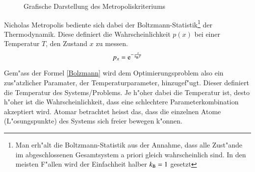 \begin{figure}[ht!]
\caption{Grafische Darstellung des Metropoliskriteriums}
\label{metropolissingle}
\end{figure}

Nicholas Metropolis bediente sich dabei der
Boltzmann-Statistik\footnote{Man erh"alt die Boltzmann-Statistik aus der
Annahme, dass alle Zust"ande im abgeschlossenen Gesamtsystem a priori
gleich wahrscheinlich sind. In den meisten F"allen wird der Einfachheit
halber $k_{\rm B} =1$ gesetzt} der Thermodynamik. Diese definiert die
Wahrscheinlichkeit $p(x)$ bei einer Temperatur $T$, den Zustand $x$
zu messen.
\begin{equation}p_x = {\rm e}^{-\frac{x}{k_{\rm B} T}}\label{Bolzmann}\end{equation}

Gem"ass der Formel \ref{Bolzmann} wird dem Optimierungsproblem also ein
zus"atzlicher Paramater, der Temperaturparameter, hinzugef"ugt. Dieser
definiert die Temperatur des Systems/Problems. Je h"oher dabei die
Temperatur ist, desto h"oher ist die Wahrscheinlichkeit, dass eine
schlechtere Parameterkombination akzeptiert wird. Atomar betrachtet
heisst das, dass die einzelnen Atome (L"osungspunkte) des Systems sich
freier bewegen k"onnen.

